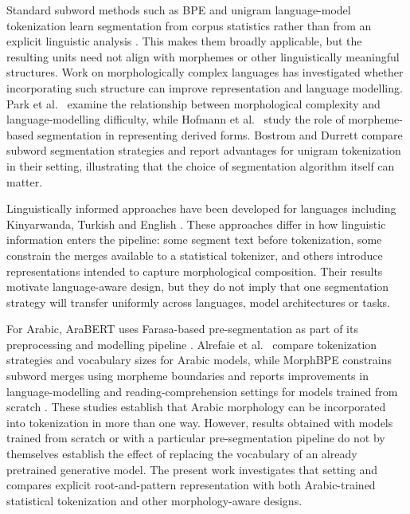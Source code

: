 \documentclass[a4paper,fleqn]{cas-sc}
\begin{document}
Standard subword methods such as BPE and unigram language-model tokenization learn segmentation from corpus statistics rather than from an explicit linguistic analysis \citep{sennrich2016neural,kudo2018sentencepiece}. This makes them broadly applicable, but the resulting units need not align with morphemes or other linguistically meaningful structures. Work on morphologically complex languages has investigated whether incorporating such structure can improve representation and language modelling. Park et al.\ \citep{park2021morphology} examine the relationship between morphological complexity and language-modelling difficulty, while Hofmann et al.\ \citep{hofmann2021superbizarre} study the role of morpheme-based segmentation in representing derived forms. Bostrom and Durrett \citep{bostrom2020byte} compare subword segmentation strategies and report advantages for unigram tokenization in their setting, illustrating that the choice of segmentation algorithm itself can matter.

Linguistically informed approaches have been developed for languages including Kinyarwanda, Turkish and English \citep{nzeyimana2022kinyabert,toraman2023impact,jabbar2023morphpiece,bauwens2024bpe,libovicky2024lexically}. These approaches differ in how linguistic information enters the pipeline: some segment text before tokenization, some constrain the merges available to a statistical tokenizer, and others introduce representations intended to capture morphological composition. Their results motivate language-aware design, but they do not imply that one segmentation strategy will transfer uniformly across languages, model architectures or tasks.

For Arabic, AraBERT uses Farasa-based pre-segmentation as part of its preprocessing and modelling pipeline \citep{antoun2020arabert}. Alrefaie et al.\ \citep{alrefaie2024exploring} compare tokenization strategies and vocabulary sizes for Arabic models, while MorphBPE constrains subword merges using morpheme boundaries and reports improvements in language-modelling and reading-comprehension settings for models trained from scratch \citep{asgari2025morphbpe,asgari2026morphbpe}. These studies establish that Arabic morphology can be incorporated into tokenization in more than one way. However, results obtained with models trained from scratch or with a particular pre-segmentation pipeline do not by themselves establish the effect of replacing the vocabulary of an already pretrained generative model. The present work investigates that setting and compares explicit root-and-pattern representation with both Arabic-trained statistical tokenization and other morphology-aware designs.
\end{document}
